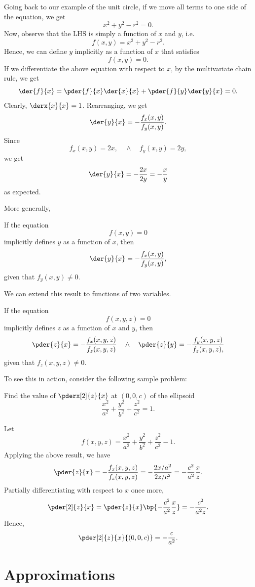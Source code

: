 Going back to our example of the unit circle, if we move all terms to one side of the equation, we get \[x^2 + y^2 - r^2 = 0.\] Now, observe that the LHS is simply a function of $x$ and $y$, i.e. \[f(x, y) = x^2 + y^2 - r^2.\] Hence, we can define $y$ implicitly as a function of $x$ that satisfies \[f(x, y) = 0.\] If we differentiate the above equation with respect to $x$, by the multivariate chain rule, we get \[\der{f}{x} = \pder{f}{x} \der{x}{x} + \pder{f}{y} \der{y}{x} = 0.\] Clearly, $\derx{x}{x} = 1$. Rearranging, we get \[\der{y}{x} = -\frac{f_x(x, y)}{f_y(x, y)}.\] Since \[f_x(x, y) = 2x, \quad \land \quad f_y(x, y) = 2y,\] we get \[\der{y}{x} = -\frac{2x}{2y} = -\frac{x}{y}\] as expected. 

More generally,
\begin{proposition}
    If the equation \[f(x, y) = 0\] implicitly defines $y$ as a function of $x$, then \[\der{y}{x} = -\frac{f_x(x, y)}{f_y(x,  y)},\] given that $f_y(x, y) \neq 0$.
\end{proposition}

We can extend this result to functions of two variables.
\begin{proposition}
    If the equation \[f(x, y, z) = 0\] implicitly defines $z$ as a function of $x$ and $y$, then \[\pder{z}{x} = -\frac{f_x(x, y, z)}{f_z(x,  y, z)} \quad \land \quad \pder{z}{y} = -\frac{f_y(x, y, z)}{f_z(x, y, z),}\] given that $f_z(x, y, z) \neq 0$.
\end{proposition}

To see this in action, consider the following sample problem:

\begin{sample}
    Find the value of $\pderx[2]{z}{x}$ at $(0, 0, c)$ of the ellipsoid \[\frac{x^2}{a^2} + \frac{y^2}{b^2} + \frac{z^2}{c^2} = 1.\]
\end{sample}
\begin{sampans}
    Let \[f(x, y, z) = \frac{x^2}{a^2} + \frac{y^2}{b^2} + \frac{z^2}{c^2} - 1.\] Applying the above result, we have \[\pder{z}{x} = -\frac{f_x(x, y, z)}{f_z(x,  y, z)} = -\frac{2x / a^2}{2z / c^2} = -\frac{c^2}{a^2} \frac{x}{z}.\] Partially differentiating with respect to $x$ once more, \[\pder[2]{z}{x} = \pder{z}{x} \bp{-\frac{c^2}{a^2} \frac{x}{z}} = -\frac{c^2}{a^2 z}.\] Hence, \[\pder[2]{z}{x}{(0, 0, c)} = -\frac{c}{a^2}.\]
\end{sampans}

\section{Approximations}

